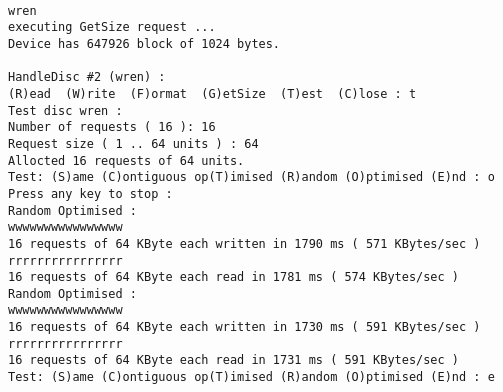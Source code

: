 \begin{screendump}
  \begin{verbatim}
                                                                            wren
executing GetSize request ...
Device has 647926 block of 1024 bytes.

HandleDisc #2 (wren) :
(R)ead  (W)rite  (F)ormat  (G)etSize  (T)est  (C)lose : t
Test disc wren :
Number of requests ( 16 ): 16
Request size ( 1 .. 64 units ) : 64
Allocted 16 requests of 64 units.
Test: (S)ame (C)ontiguous op(T)imised (R)andom (O)ptimised (E)nd : o
Press any key to stop :
Random Optimised :
wwwwwwwwwwwwwwww
16 requests of 64 KByte each written in 1790 ms ( 571 KBytes/sec )
rrrrrrrrrrrrrrrr
16 requests of 64 KByte each read in 1781 ms ( 574 KBytes/sec )
Random Optimised :
wwwwwwwwwwwwwwww
16 requests of 64 KByte each written in 1730 ms ( 591 KBytes/sec )
rrrrrrrrrrrrrrrr
16 requests of 64 KByte each read in 1731 ms ( 591 KBytes/sec )
Test: (S)ame (C)ontiguous op(T)imised (R)andom (O)ptimised (E)nd : e
  \end{verbatim}
\end{screendump}
